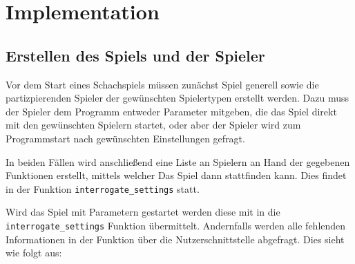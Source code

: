 
\chapter{Implementation}

\section{Erstellen des Spiels und der
Spieler}\label{erstellen-des-spiels-und-der-spieler}

Vor dem Start eines Schachspiels müssen zunächst Spiel generell sowie
die partizpierenden Spieler der gewünschten Spielertypen erstellt
werden. Dazu muss der Spieler dem Programm entweder Parameter mitgeben,
die das Spiel direkt mit den gewünschten Spielern startet, oder aber der
Spieler wird zum Programmstart nach gewünschten Einstellungen gefragt.

In beiden Fällen wird anschließend eine Liste an Spielern an Hand der
gegebenen Funktionen erstellt, mittels welcher Das Spiel dann
stattfinden kann. Dies findet in der Funktion
\texttt{interrogate\_settings} statt.

Wird das Spiel mit Parametern gestartet werden diese mit in die
\texttt{interrogate\_settings} Funktion übermittelt. Andernfalls werden
alle fehlenden Informationen in der Funktion über die
Nutzerschnittstelle abgefragt. Dies sieht wie folgt aus:

